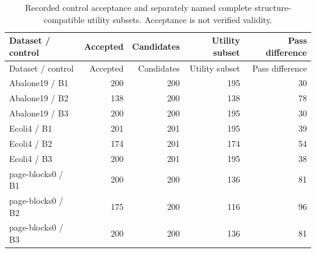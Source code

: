 \begin{longtable}{lrrrr}
\caption{Recorded control acceptance and separately named complete structure-compatible utility subsets. Acceptance is not verified validity.}\label{tab:controls}\\
\toprule
Dataset / control & Accepted & Candidates & Utility subset & Pass difference \\
\midrule
\endfirsthead
\toprule
Dataset / control & Accepted & Candidates & Utility subset & Pass difference \\
\midrule
\endhead
Abalone19 / B1 & 200 & 200 & 195 & 30 \\
Abalone19 / B2 & 138 & 200 & 138 & 78 \\
Abalone19 / B3 & 200 & 200 & 195 & 30 \\
Ecoli4 / B1 & 201 & 201 & 195 & 39 \\
Ecoli4 / B2 & 174 & 201 & 174 & 54 \\
Ecoli4 / B3 & 200 & 201 & 195 & 38 \\
page-blocks0 / B1 & 200 & 200 & 136 & 81 \\
page-blocks0 / B2 & 175 & 200 & 116 & 96 \\
page-blocks0 / B3 & 200 & 200 & 136 & 81 \\
\bottomrule
\end{longtable}
